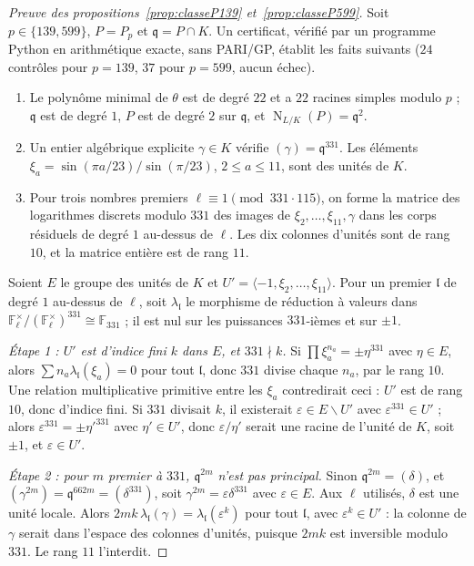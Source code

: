 \documentclass[11pt,a4paper]{amsart}
\theoremstyle{plain}
\theoremstyle{definition}
\numberwithin{equation}{section}
\newcommand{\F}{\mathbb{F}}
\newcommand{\q}{\mathfrak{q}}
\DeclareMathOperator{\Nm}{N}
\begin{document}
\begin{proof}[Preuve des propositions~\ref{prop:classeP139} et~\ref{prop:classeP599}]
Soit $p\in\{139,599\}$, $P=P_p$ et $\q=P\cap K$. Un certificat, vérifié par un programme Python en arithmétique exacte, sans PARI/GP, établit les faits suivants ($24$ contrôles pour $p=139$, $37$ pour $p=599$, aucun échec).
\begin{enumerate}[label=\textup{(\roman*)}]
\item Le polynôme minimal de $\theta$ est de degré $22$ et a $22$ racines simples modulo $p$ ; $\q$ est de degré $1$, $P$ est de degré $2$ sur $\q$, et $\Nm_{L/K}(P)=\q^2$.
\item Un entier algébrique explicite $\gamma\in K$ vérifie $(\gamma)=\q^{331}$. Les éléments $\xi_a=\sin(\pi a/23)/\sin(\pi/23)$, $2\le a\le11$, sont des unités de $K$.
\item Pour trois nombres premiers $\ell\equiv1\pmod{331\cdot115}$, on forme la matrice des logarithmes discrets modulo $331$ des images de $\xi_2,\dots,\xi_{11},\gamma$ dans les corps résiduels de degré $1$ au-dessus de $\ell$. Les dix colonnes d'unités sont de rang $10$, et la matrice entière est de rang $11$.
\end{enumerate}
Soient $E$ le groupe des unités de $K$ et $U'=\langle-1,\xi_2,\dots,\xi_{11}\rangle$. Pour un premier $\mathfrak l$ de degré $1$ au-dessus de $\ell$, soit $\lambda_{\mathfrak l}$ le morphisme de réduction à valeurs dans $\F_\ell^\times/(\F_\ell^\times)^{331}\cong\F_{331}$ ; il est nul sur les puissances $331$-ièmes et sur $\pm1$.

\emph{Étape 1 : $U'$ est d'indice fini $k$ dans $E$, et $331\nmid k$.} Si $\prod\xi_a^{n_a}=\pm\eta^{331}$ avec $\eta\in E$, alors $\sum n_a\lambda_{\mathfrak l}(\xi_a)=0$ pour tout $\mathfrak l$, donc $331$ divise chaque $n_a$, par le rang $10$. Une relation multiplicative primitive entre les $\xi_a$ contredirait ceci : $U'$ est de rang $10$, donc d'indice fini. Si $331$ divisait $k$, il existerait $\varepsilon\in E\smallsetminus U'$ avec $\varepsilon^{331}\in U'$ ; alors $\varepsilon^{331}=\pm\eta'^{331}$ avec $\eta'\in U'$, donc $\varepsilon/\eta'$ serait une racine de l'unité de $K$, soit $\pm1$, et $\varepsilon\in U'$.

\emph{Étape 2 : pour $m$ premier à $331$, $\q^{2m}$ n'est pas principal.} Sinon $\q^{2m}=(\delta)$, et $(\gamma^{2m})=\q^{662m}=(\delta^{331})$, soit $\gamma^{2m}=\varepsilon\delta^{331}$ avec $\varepsilon\in E$. Aux $\ell$ utilisés, $\delta$ est une unité locale. Alors $2mk\,\lambda_{\mathfrak l}(\gamma)=\lambda_{\mathfrak l}(\varepsilon^k)$ pour tout $\mathfrak l$, avec $\varepsilon^k\in U'$ : la colonne de $\gamma$ serait dans l'espace des colonnes d'unités, puisque $2mk$ est inversible modulo $331$. Le rang $11$ l'interdit.


\end{proof}
\end{document}
